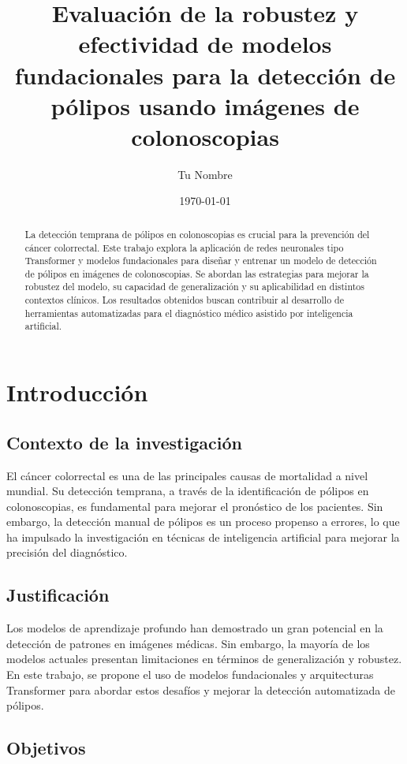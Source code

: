 \documentclass[a4paper,12pt]{report}
\title{Evaluación de la robustez y efectividad de modelos fundacionales para la detección de pólipos usando imágenes de colonoscopias}
\author{Tu Nombre}
\date{\today}
\begin{document}
\maketitle

\begin{abstract}
La detección temprana de pólipos en colonoscopias es crucial para la prevención del cáncer colorrectal. Este trabajo explora la aplicación de redes neuronales tipo Transformer y modelos fundacionales para diseñar y entrenar un modelo de detección de pólipos en imágenes de colonoscopias. Se abordan las estrategias para mejorar la robustez del modelo, su capacidad de generalización y su aplicabilidad en distintos contextos clínicos. Los resultados obtenidos buscan contribuir al desarrollo de herramientas automatizadas para el diagnóstico médico asistido por inteligencia artificial.
\end{abstract}

\tableofcontents

\chapter{Introducción}
\section{Contexto de la investigación}
El cáncer colorrectal es una de las principales causas de mortalidad a nivel mundial. Su detección temprana, a través de la identificación de pólipos en colonoscopias, es fundamental para mejorar el pronóstico de los pacientes. Sin embargo, la detección manual de pólipos es un proceso propenso a errores, lo que ha impulsado la investigación en técnicas de inteligencia artificial para mejorar la precisión del diagnóstico.

\section{Justificación}
Los modelos de aprendizaje profundo han demostrado un gran potencial en la detección de patrones en imágenes médicas. Sin embargo, la mayoría de los modelos actuales presentan limitaciones en términos de generalización y robustez. En este trabajo, se propone el uso de modelos fundacionales y arquitecturas Transformer para abordar estos desafíos y mejorar la detección automatizada de pólipos.

\section{Objetivos}
\end{document}
